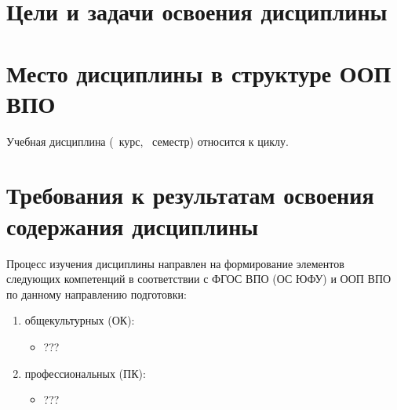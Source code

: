 

\date{2014}





\section{Цели и задачи освоения дисциплины}

\section{Место дисциплины в структуре ООП ВПО}


	\ssect Учебная дисциплина \thecourse{}
(\theyearofstudy~курс, \theterm~семестр) относится к  %
циклу.

	\ssect %

	\ssect %

\section{Требования к результатам освоения содержания дисциплины}

	\ssect
Процесс изучения дисциплины направлен на формирование элементов следующих компетенций в соответствии с ФГОС ВПО (ОС ЮФУ) и ООП ВПО по данному направлению подготовки:

\begin{enumerate}
	\item общекультурных (ОК):
	\begin{itemize}
		\item ???
	\end{itemize}

	\item профессиональных (ПК):
	\begin{itemize}
		\item ???
	\end{itemize}
\end{enumerate}


